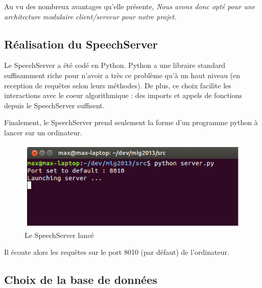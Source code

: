 \documentclass[a4paper,12pt]{report}
\begin{document}
Au vu des nombreux avantages qu'elle présente,
\emph{Nous avons donc opté pour une architecture modulaire client/serveur pour notre projet.}

\subsection{Réalisation du SpeechServer}

Le SpeechServer a été codé en Python. Python a une libraire standard suffisamment riche pour n'avoir a très ce problème qu'à un haut niveau (en reception de requêtes selon leurs méthodes). De plus, ce choix facilite les interactions avec le coeur algorithmique : des imports et appels de fonctions depuis le SpeechServer suffisent.

Finalement, le SpeechServer prend seulement la forme d'un programme python à lancer sur un ordinateur.

\begin{figure}
	\begin{center}
	\includegraphics[width=14cm]{pics/server.png} 
	\end{center}
	\caption{Le SpeechServer lancé}
\end{figure}

Il écoute alors les requêtes sur le port 8010 (par défaut) de l'ordinateur.

\subsection{Choix de la base de données}
\end{document}
